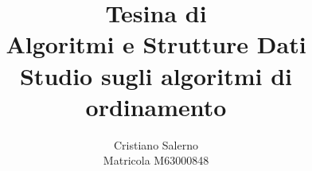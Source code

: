 

\usepackage{bookmark}


\hypertarget{TitlePage}{}
\title{\textbf{Tesina di\\Algoritmi e Strutture Dati}\\
	{\Large Studio sugli algoritmi di ordinamento}}
\author{Cristiano Salerno\\Matricola M63000848}
\date{}
\maketitle
{}

\tableofcontents








